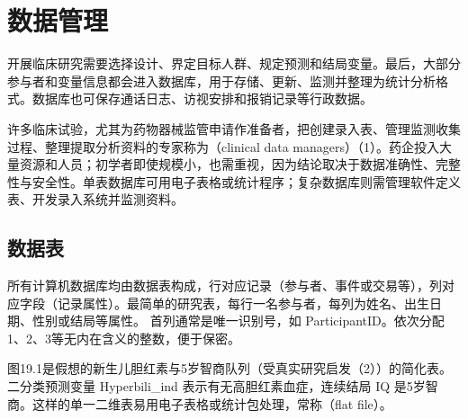 \chapter{数据管理}
开展临床研究需要选择设计、界定目标人群、规定预测和结局变量。最后，大部分参与者和变量信息都会进入数据库，用于存储、更新、监测并整理为统计分析格式。数据库也可保存通话日志、访视安排和报销记录等行政数据。

许多临床试验，尤其为药物器械监管申请作准备者，把创建录入表、管理监测收集过程、整理提取分析资料的专家称为（clinical data managers）（1）。药企投入大量资源和人员；初学者即使规模小，也需重视，因为结论取决于数据准确性、完整性与安全性。单表数据库可用电子表格或统计程序；复杂数据库则需管理软件定义表、开发录入系统并监测资料。

\section{数据表}
所有计算机数据库均由数据表构成，行对应记录（参与者、事件或交易等），列对应字段（记录属性）。最简单的研究表，每行一名参与者，每列为姓名、出生日期、性别或结局等属性。
首列通常是唯一识别号，如 ParticipantID。依次分配1、2、3等无内在含义的整数，便于保密。

图19.1是假想的新生儿胆红素与5岁智商队列（受真实研究启发（2））的简化表。二分类预测变量 Hyperbili\_ind 表示有无高胆红素血症，连续结局 IQ 是5岁智商。这样的单一二维表易用电子表格或统计包处理，常称（flat file）。

